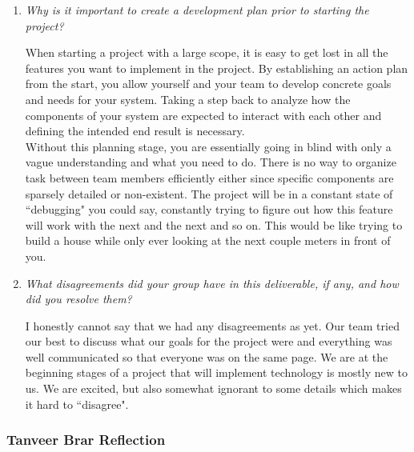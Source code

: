 \documentclass{article}
\begin{document}
\begin{enumerate}

  \item \textit{Why is it important to create a development plan prior to starting the project?}

    When starting a project with a large scope, it is easy to get lost in all the features you want to implement in the project.
    By establishing an action plan from the start, you allow yourself and your team to develop concrete goals and needs for your system. Taking a step back to analyze how the components of your system are expected to interact with each other and defining the intended end result is necessary.\\

    Without this planning stage, you are essentially going in blind with only a vague understanding and what you need to do. There is
    no way to organize task between team members efficiently either since specific components are sparsely detailed or non-existent. The
    project will be in a constant state of ``debugging" you could say, constantly trying to figure out how this feature will work with the
    next and the next and so on. This would be like trying to build a house while only ever looking at the next couple meters in front of you.

  \item \textit{What disagreements did your group have in this deliverable, if any, and how did you resolve them?}
  
  I honestly cannot say that we had any disagreements as yet. Our team tried our best to discuss what our goals for the project were and
  everything was well communicated so that everyone was on the same page. We are at the beginning stages of a project that will implement
  technology is mostly new to us. We are excited, but also somewhat ignorant to some details which makes it hard to ``disagree".

\end{enumerate}

\subsubsection*{Tanveer Brar Reflection}
\end{document}
